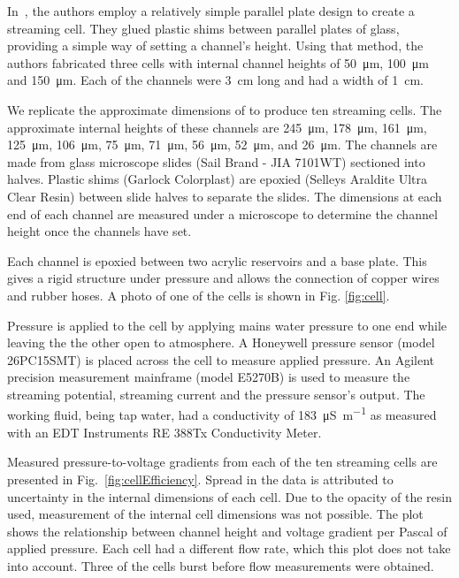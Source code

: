 \documentclass[10pt,final,journal]{IEEEtran}
\begin{document}
    In~\cite{Gu2000}, the authors employ a relatively simple parallel plate design to create a streaming cell.
    They glued plastic shims between parallel plates of glass, providing a simple way of setting a channel's height.
    Using that method, the authors fabricated three cells with internal channel heights of \SI{50}{\micro\metre}, \SI{100}{\micro\metre} and \SI{150}{\micro\metre}.
    Each of the channels were \SI{3}{\centi\metre} long and had a width of \SI{1}{\centi\metre}.

    We replicate the approximate dimensions of \cite{Gu2000} to produce ten streaming cells.
    The approximate internal heights of these channels are \SI{245}{\micro\metre}, \SI{178}{\micro\metre}, \SI{161}{\micro\metre}, \SI{125}{\micro\metre}, \SI{106}{\micro\metre}, \SI{75}{\micro\metre}, \SI{71}{\micro\metre}, \SI{56}{\micro\metre}, \SI{52}{\micro\metre}, and \SI{26}{\micro\metre}.
    The channels are made from glass microscope slides (Sail Brand - JIA 7101WT) sectioned into halves.
    Plastic shims (Garlock Colorplast) are epoxied (Selleys Araldite Ultra Clear Resin) between slide halves to separate the slides.
    The dimensions at each end of each channel are measured under a microscope to determine the channel height once the channels have set.

    Each channel is epoxied between two acrylic reservoirs and a base plate.
    This gives a rigid structure under pressure and allows the connection of copper wires and rubber hoses.
    A photo of one of the cells is shown in Fig. \ref{fig:cell}.

    Pressure is applied to the cell by applying mains water pressure to one end while leaving the the other open to atmosphere.
    A Honeywell pressure sensor (model 26PC15SMT) is placed across the cell to measure applied pressure.
    An Agilent precision measurement mainframe (model E5270B) is used to measure the streaming potential, streaming current and the pressure sensor's output.
    The working fluid, being tap water, had a conductivity of \SI{183}{\micro\siemens\per\metre} as measured with an EDT Instruments RE 388Tx Conductivity Meter.

    Measured pressure-to-voltage gradients from each of the ten streaming cells are presented in Fig.~\ref{fig:cellEfficiency}.
    Spread in the data is attributed to uncertainty in the internal dimensions of each cell.
    Due to the opacity of the resin used, measurement of the internal cell dimensions was not possible.
    The plot shows the relationship between channel height and voltage gradient per Pascal of applied pressure.
    Each cell had a different flow rate, which this plot does not take into account.
    Three of the cells burst before flow measurements were obtained.
\end{document}
